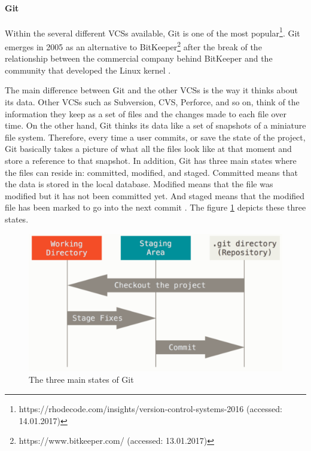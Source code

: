 \paragraph{Git}
Within the several different VCSs available, Git is one of the most popular\footnote{https://rhodecode.com/insights/version-control-systems-2016 (accessed: 14.01.2017)}. Git emerges in 2005 as an alternative to BitKeeper\footnote{https://www.bitkeeper.com/ (accessed: 13.01.2017)} after the break of the relationship between the commercial company behind BitKeeper and  the community that developed the Linux kernel \citep{Chacon2009}.

The main difference between Git and the other VCSs is the way it thinks about its data. Other VCSs such as Subversion, CVS, Perforce, and so on, think of the information they keep as a set of files and the changes made to each file over time. On the other hand, Git thinks its data like a set of snapshots of a miniature file system. Therefore, every time a user commits, or save the state of the project, Git basically takes a picture of what all the files look like at that moment and store a reference to that snapshot. In addition, Git has three main states where the files can reside in: committed, modified, and staged. Committed means that the data is stored in the local database. Modified means that the file was modified but it has not been committed yet. And staged means that the modified file has been marked to go into the next commit \citep{Chacon2009}. The figure \ref{fig:git-sates} depicts these three states.

\begin{figure}[ht]
	\centering
    \includegraphics[width=\textwidth]{grafiken/git-states}
    \caption{The three main states of Git \citep{Chacon2009}}
    \label{fig:git-sates}
\end{figure}

